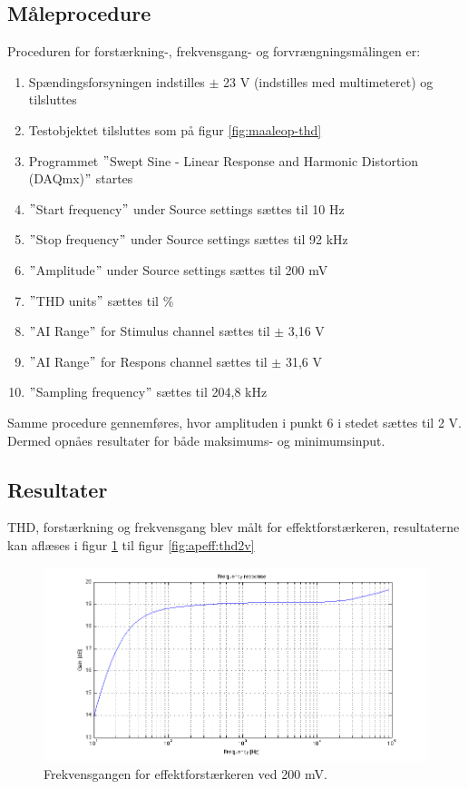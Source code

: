 \subsection*{Måleprocedure}
Proceduren for forstærkning-, frekvensgang- og forvrængningsmålingen er:

\begin{enumerate}
\item Spændingsforsyningen indstilles $\pm$ 23 V (indstilles med multimeteret) og tilsluttes
\item Testobjektet tilsluttes som på figur \ref{fig:maaleop-thd}
\item Programmet $"$Swept Sine - Linear Response and Harmonic Distortion (DAQmx)$"$ startes
\item $"$Start frequency$"$ under Source settings sættes til 10 Hz
\item $"$Stop frequency$"$ under Source settings sættes til 92 kHz
\item $"$Amplitude$"$ under Source settings sættes til 200 mV
\item $"$THD units$"$ sættes til \%
\item $"$AI Range$"$ for Stimulus channel sættes til $\pm$ 3,16 V
\item $"$AI Range$"$ for Respons channel sættes til $\pm$ 31,6 V
\item $"$Sampling frequency$"$ sættes til 204,8 kHz
\end{enumerate}

Samme procedure gennemføres, hvor amplituden i punkt 6 i stedet sættes til 2 V. Dermed opnåes resultater for både maksimums- og minimumsinput. 


\subsection*{Resultater}
THD, forstærkning og frekvensgang blev målt for effektforstærkeren, resultaterne kan aflæses i figur \ref{fig:apeff:frek200mv} til figur \ref{fig:apeff:thd2v} 

\begin{figure}[h]
\centering
\includegraphics[width=\textwidth]{maalerapporter/effektforstaerker/200mV-45mA-uden-modstand-frek.png}
\caption{Frekvensgangen for effektforstærkeren ved 200 mV.}
\label{fig:apeff:frek200mv}
\end{figure}

